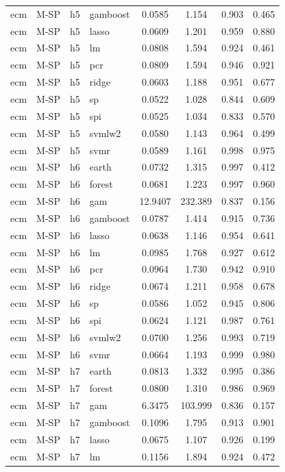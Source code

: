 \begin{ThreePartTable}
\begin{longtable}[t]{llclcccc}
ecm & M-SP & h5 & gamboost & 0.0585 & 1.154 & 0.903 & 0.465\\
ecm & M-SP & h5 & lasso & 0.0609 & 1.201 & 0.959 & 0.880\\
ecm & M-SP & h5 & lm & 0.0808 & 1.594 & 0.924 & 0.461\\
ecm & M-SP & h5 & pcr & 0.0809 & 1.594 & 0.946 & 0.921\\
ecm & M-SP & h5 & ridge & 0.0603 & 1.188 & 0.951 & 0.677\\
ecm & M-SP & h5 & sp & 0.0522 & 1.028 & 0.844 & 0.609\\
ecm & M-SP & h5 & spi & 0.0525 & 1.034 & 0.833 & 0.570\\
ecm & M-SP & h5 & svmlw2 & 0.0580 & 1.143 & 0.964 & 0.499\\
ecm & M-SP & h5 & svmr & 0.0589 & 1.161 & 0.998 & 0.975\\
\addlinespace
ecm & M-SP & h6 & earth & 0.0732 & 1.315 & 0.997 & 0.412\\
ecm & M-SP & h6 & forest & 0.0681 & 1.223 & 0.997 & 0.960\\
ecm & M-SP & h6 & gam & 12.9407 & 232.389 & 0.837 & 0.156\\
ecm & M-SP & h6 & gamboost & 0.0787 & 1.414 & 0.915 & 0.736\\
ecm & M-SP & h6 & lasso & 0.0638 & 1.146 & 0.954 & 0.641\\
ecm & M-SP & h6 & lm & 0.0985 & 1.768 & 0.927 & 0.612\\
ecm & M-SP & h6 & pcr & 0.0964 & 1.730 & 0.942 & 0.910\\
ecm & M-SP & h6 & ridge & 0.0674 & 1.211 & 0.958 & 0.678\\
ecm & M-SP & h6 & sp & 0.0586 & 1.052 & 0.945 & 0.806\\
ecm & M-SP & h6 & spi & 0.0624 & 1.121 & 0.987 & 0.761\\
ecm & M-SP & h6 & svmlw2 & 0.0700 & 1.256 & 0.993 & 0.719\\
ecm & M-SP & h6 & svmr & 0.0664 & 1.193 & 0.999 & 0.980\\
\addlinespace
ecm & M-SP & h7 & earth & 0.0813 & 1.332 & 0.995 & 0.386\\
ecm & M-SP & h7 & forest & 0.0800 & 1.310 & 0.986 & 0.969\\
ecm & M-SP & h7 & gam & 6.3475 & 103.999 & 0.836 & 0.157\\
ecm & M-SP & h7 & gamboost & 0.1096 & 1.795 & 0.913 & 0.901\\
ecm & M-SP & h7 & lasso & 0.0675 & 1.107 & 0.926 & 0.199\\
ecm & M-SP & h7 & lm & 0.1156 & 1.894 & 0.924 & 0.472\\

\end{longtable}
\end{ThreePartTable}
